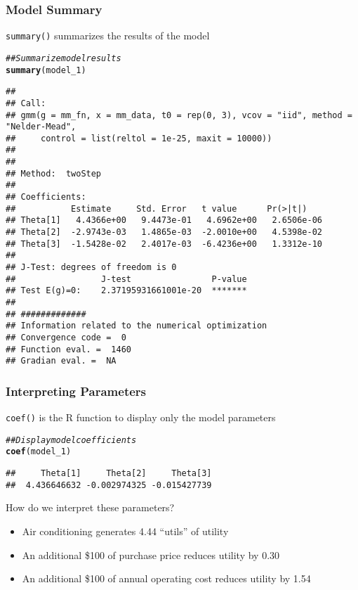 \documentclass{beamer}\usepackage[]{graphicx}\usepackage[]{xcolor}
\makeatletter
\newcommand{\hlcom}[1]{\textcolor[rgb]{0.678,0.584,0.686}{\textit{#1}}}%
\newcommand{\hlstd}[1]{\textcolor[rgb]{0.345,0.345,0.345}{#1}}%
\newcommand{\hlkwd}[1]{\textcolor[rgb]{0.737,0.353,0.396}{\textbf{#1}}}%
\newenvironment{kframe}{%
 \def\at@end@of@kframe{}%
 \ifinner\ifhmode%
  \def\at@end@of@kframe{\end{minipage}}%
  \begin{minipage}{\columnwidth}%
 \fi\fi%
 \def\FrameCommand##1{\hskip\@totalleftmargin \hskip-\fboxsep
 \colorbox{shadecolor}{##1}\hskip-\fboxsep
     \hskip-\linewidth \hskip-\@totalleftmargin \hskip\columnwidth}%
 \MakeFramed {\advance\hsize-\width
   \@totalleftmargin\z@ \linewidth\hsize
   \@setminipage}}%
 {\par\unskip\endMakeFramed%
 \at@end@of@kframe}
\newenvironment{knitrout}{}{} %
\makeatother
\begin{document}
\begin{frame}[fragile]\frametitle{Model Summary}
    \texttt{summary()} summarizes the results of the model
    \vspace{1ex}
\begin{knitrout}\tiny
{}\color{fgcolor}\begin{kframe}
\begin{alltt}
\hlcom{## Summarize model results}
\hlkwd{summary}\hlstd{(model_1)}
\end{alltt}
\begin{verbatim}
## 
## Call:
## gmm(g = mm_fn, x = mm_data, t0 = rep(0, 3), vcov = "iid", method = "Nelder-Mead", 
##     control = list(reltol = 1e-25, maxit = 10000))
## 
## 
## Method:  twoStep 
## 
## Coefficients:
##           Estimate     Std. Error   t value      Pr(>|t|)   
## Theta[1]   4.4366e+00   9.4473e-01   4.6962e+00   2.6506e-06
## Theta[2]  -2.9743e-03   1.4865e-03  -2.0010e+00   4.5398e-02
## Theta[3]  -1.5428e-02   2.4017e-03  -6.4236e+00   1.3312e-10
## 
## J-Test: degrees of freedom is 0 
##                 J-test                P-value             
## Test E(g)=0:    2.37195931661001e-20  *******             
## 
## #############
## Information related to the numerical optimization
## Convergence code =  0 
## Function eval. =  1460 
## Gradian eval. =  NA
\end{verbatim}
\end{kframe}
\end{knitrout}
\end{frame}

\begin{frame}[fragile]\frametitle{Interpreting Parameters}
    \texttt{coef()} is the R function to display only the model parameters
\begin{knitrout}\footnotesize
{}\color{fgcolor}\begin{kframe}
\begin{alltt}
\hlcom{## Display model coefficients}
\hlkwd{coef}\hlstd{(model_1)}
\end{alltt}
\begin{verbatim}
##     Theta[1]     Theta[2]     Theta[3] 
##  4.436646632 -0.002974325 -0.015427739
\end{verbatim}
\end{kframe}
\end{knitrout}
    \vspace{2ex}
    How do we interpret these parameters?
    \begin{itemize}
        \item Air conditioning generates 4.44 ``utils'' of utility
        \item An additional \$100 of purchase price reduces utility by 0.30
        \item An additional \$100 of annual operating cost reduces utility by 1.54
    \end{itemize}
\end{frame}
\end{document}
